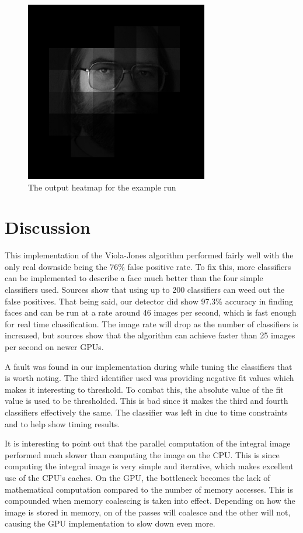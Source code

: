 \documentclass[12pt] {article}
\begin{document}
\begin{figure}[h!]
	\centering
		\includegraphics[width=80mm]{heatmap.png}
		\caption{The output heatmap for the example run}
\end{figure}


\section{Discussion}
This implementation of the Viola-Jones algorithm performed fairly well with the only real downside being the 76\% false positive rate. To fix this, more classifiers can be implemented to describe a face much better than the four simple classifiers used. Sources show that using up to 200 classifiers can weed out the false positives. That being said, our detector did show 97.3\% accuracy in finding faces and can be run at a rate around 46 images per second, which is fast enough for real time classification. The image rate will drop as the number of classifiers is increased, but sources show that the algorithm can achieve faster than 25 images per second on newer GPUs.

A fault was found in our implementation during while tuning the classifiers that is worth noting. The third identifier used was providing negative fit values which makes it interesting to threshold. To combat this, the absolute value of the fit value is used to be thresholded. This is bad since it makes the third and fourth classifiers effectively the same. The classifier was left in due to time constraints and to help show timing results. 

It is interesting to point out that the parallel computation of the integral image performed much slower than computing the image on the CPU. This is since computing the integral image is very simple and iterative, which makes excellent use of the CPU's caches. On the GPU, the bottleneck becomes the lack of mathematical computation compared to the number of memory accesses. This is compounded when memory coalescing is taken into effect. Depending on how the image is stored in memory, on of the passes will coalesce and the other will not, causing the GPU implementation to slow down even more.
\end{document}
